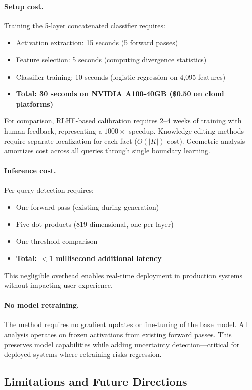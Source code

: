 \documentclass[11pt]{article}
\begin{document}
\paragraph{Setup cost.} Training the 5-layer concatenated classifier requires:
\begin{itemize}
\item Activation extraction: 15 seconds (5 forward passes)
\item Feature selection: 5 seconds (computing divergence statistics)
\item Classifier training: 10 seconds (logistic regression on 4,095 features)
\item \textbf{Total: 30 seconds on NVIDIA A100-40GB (\$0.50 on cloud platforms)}
\end{itemize}

For comparison, RLHF-based calibration requires 2--4 weeks of training with human feedback, representing a $1000\times$ speedup. Knowledge editing methods require separate localization for each fact ($O(|K|)$ cost). Geometric analysis amortizes cost across all queries through single boundary learning.

\paragraph{Inference cost.} Per-query detection requires:
\begin{itemize}
\item One forward pass (existing during generation)
\item Five dot products (819-dimensional, one per layer)
\item One threshold comparison
\item \textbf{Total: $<$1 millisecond additional latency}
\end{itemize}

This negligible overhead enables real-time deployment in production systems without impacting user experience.

\paragraph{No model retraining.} The method requires no gradient updates or fine-tuning of the base model. All analysis operates on frozen activations from existing forward passes. This preserves model capabilities while adding uncertainty detection---critical for deployed systems where retraining risks regression.

\subsection{Limitations and Future Directions}
\end{document}
